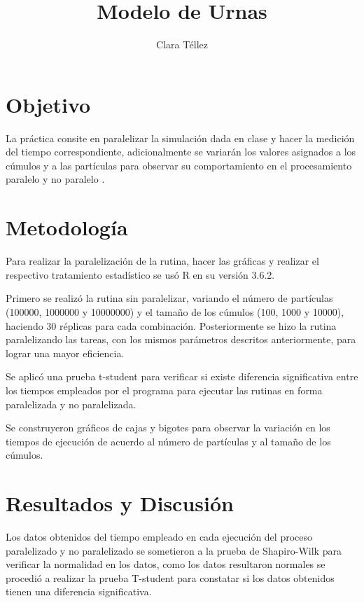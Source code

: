 \documentclass{article}
\begin{document}
\title{\textbf{Modelo de Urnas}}
\author{Clara T\'ellez}
\maketitle

\section{Objetivo}\label{obj}

La pr\'actica consite en paralelizar la simulaci\'on dada en clase y hacer la medici\'on del tiempo correspondiente, adicionalmente se variar\'an los valores asignados a los c\'umulos y a las part\'iculas para observar su comportamiento en el procesamiento paralelo y no paralelo \cite{eli}.

\section{Metodolog\'ia}\label{met}

Para realizar la paralelizaci\'on de la rutina, hacer las gr\'aficas y realizar el respectivo tratamiento estad\'istico se us\'o R en su versi\'on 3.6.2.


Primero se realiz\'o la rutina sin paralelizar, variando el n\'umero de part\'iculas (100000, 1000000 y 10000000) y el tama\~no de los c\'umulos (100, 1000 y 10000), haciendo 30 r\'eplicas para cada combinaci\'on.  Posteriormente se hizo la rutina paralelizando las tareas, con los mismos par\'ametros descritos anteriormente, para lograr una mayor eficiencia.

Se aplic\'o una prueba t-student para verificar si existe diferencia significativa entre los tiempos empleados por el programa para ejecutar las rutinas en forma paralelizada y no paralelizada.  

Se construyeron gr\'aficos de cajas y bigotes para observar la variaci\'on en los tiempos de ejecuci\'on de acuerdo al n\'umero de part\'iculas y al tama\~no de los c\'umulos.

\section{Resultados y Discusi\'on}\label{res}

Los datos obtenidos del tiempo empleado en cada ejecuci\'on del proceso paralelizado y no paralelizado se sometieron a la prueba de Shapiro-Wilk para verificar la normalidad en los datos, como los datos resultaron normales se procedi\'o a realizar la prueba T-student para constatar si los datos obtenidos tienen una diferencia significativa.
\end{document}
